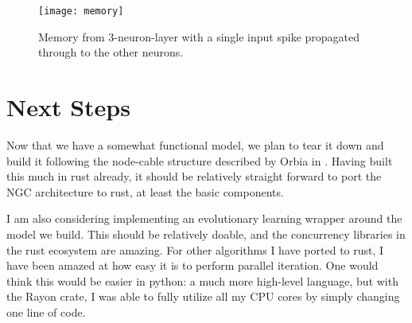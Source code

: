 \documentclass[12pt,english]{article}
\begin{document}

\begin{figure}[h]
    \centering
    \texttt{[image: memory]}
    \caption{Memory from 3-neuron-layer with a single input spike propagated through to the other neurons.}
    \label{fig-mem}
\end{figure}

\section{Next Steps}

Now that we have a somewhat functional model, we plan to tear it down and build it following the node-cable structure described by Orbia in \cite{NGC}.
Having built this much in rust already, it should be relatively straight forward to port the NGC architecture to rust, at least the basic components.

I am also considering implementing an evolutionary learning wrapper around the model we build.
This should be relatively doable, and the concurrency libraries in the rust ecosystem are amazing.
For other algorithms I have ported to rust, I have been amazed at how easy it is to perform parallel iteration.
One would think this would be easier in python: a much more high-level language, but with the Rayon crate, I was able to fully utilize all my CPU cores by simply changing one line of code.





\lstlistoflistings
\end{document}

